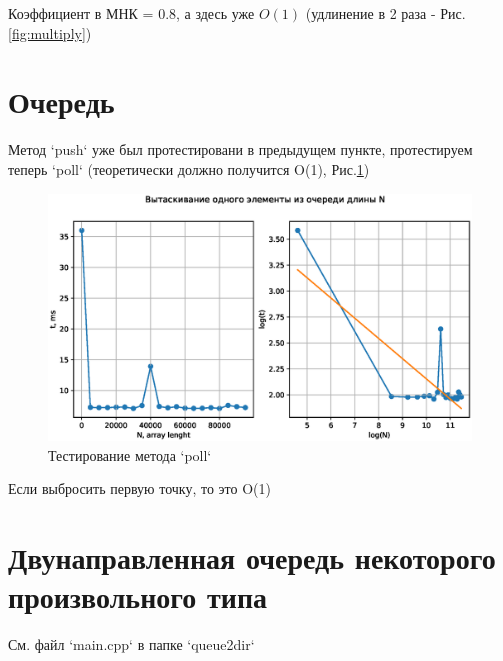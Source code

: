 \documentclass[a4paper, 12pt]{report}
\renewcommand{\figurename}{Рис.}
\begin{document}
	Коэффициент в МНК = 0.8, а здесь уже $O(1)$ (удлинение в 2 раза - \figurename \ref{fig:multiply})
	\section*{Очередь}
	Метод `push` уже был протестировани в предыдущем пункте, протестируем теперь `poll` (теоретически должно получится O(1), \figurename \ref{fig:poll})
	
	\begin{figure}[h]
		\centering
		\includegraphics[width=0.6\linewidth]{./queue/poll.eps}
		\caption{Тестирование метода `poll`}
		\label{fig:poll}
	\end{figure}

	Если выбросить первую точку, то это O(1)
	
	\section*{Двунаправленная очередь некоторого произвольного типа}
	
	См. файл `main.cpp` в папке `queue2dir`
\end{document}

